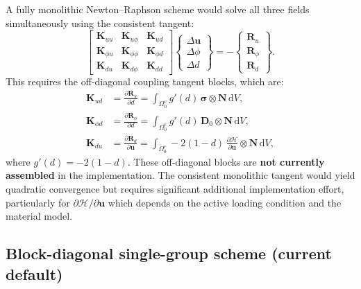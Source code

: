 \documentclass[11pt,a4paper]{article}
\newcommand{\DD}{\bm{D}}
\newcommand{\ssigma}{\bm{\sigma}}
\newcommand{\uu}{\bm{u}}
\newcommand{\diff}{\mathrm{d}}
\newcommand{\pd}[2]{\frac{\partial #1}{\partial #2}}
\begin{document}
A fully monolithic Newton--Raphson scheme would solve all three fields simultaneously using the consistent tangent:
\begin{equation}
    \begin{bmatrix}
        \bm{K}_{uu} & \bm{K}_{u\phi} & \bm{K}_{ud} \\
        \bm{K}_{\phi u} & \bm{K}_{\phi\phi} & \bm{K}_{\phi d} \\
        \bm{K}_{du} & \bm{K}_{d\phi} & \bm{K}_{dd}
    \end{bmatrix}
    \begin{Bmatrix}
        \Delta \uu \\ \Delta \phi \\ \Delta d
    \end{Bmatrix}
    = -
    \begin{Bmatrix}
        \bm{R}_u \\ \bm{R}_\phi \\ \bm{R}_d
    \end{Bmatrix}.
\end{equation}
This requires the off-diagonal coupling tangent blocks, which are:
\begin{align}
    \bm{K}_{ud} &= \pd{\bm{R}_u}{d} = \int_{\Omega_0^e} g'(d)\, \ssigma \otimes \bm{N} \, \diff V, \\
    \bm{K}_{\phi d} &= \pd{\bm{R}_\phi}{d} = \int_{\Omega_0^e} g'(d)\, \DD_0 \otimes \bm{N} \, \diff V, \\
    \bm{K}_{du} &= \pd{\bm{R}_d}{\uu} = \int_{\Omega_0^e} -2(1-d)\, \pd{\mathcal{H}}{\uu} \otimes \bm{N} \, \diff V,
\end{align}
where $g'(d) = -2(1-d)$. These off-diagonal blocks are \textbf{not currently assembled} in the implementation. The consistent monolithic tangent would yield quadratic convergence but requires significant additional implementation effort, particularly for $\partial\mathcal{H}/\partial\uu$ which depends on the active loading condition and the material model.

\subsection{Block-diagonal single-group scheme (current default)}
\end{document}
